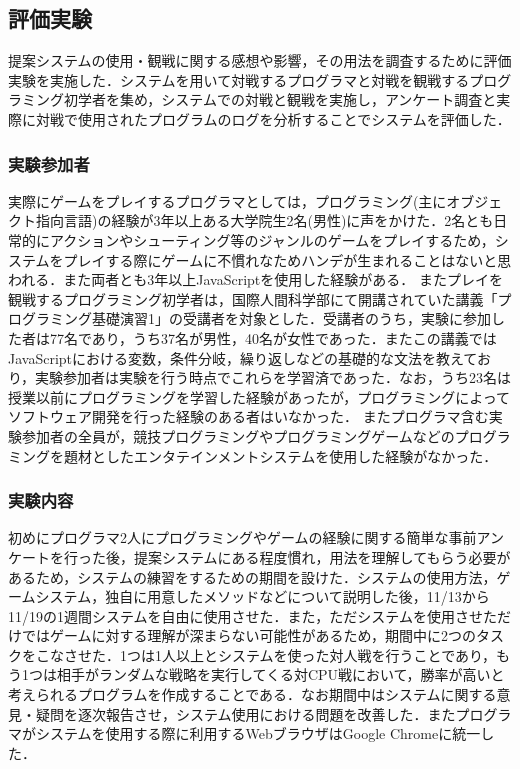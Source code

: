 \subsection{評価実験}
提案システムの使用・観戦に関する感想や影響，その用法を調査するために評価実験を実施した．システムを用いて対戦するプログラマと対戦を観戦するプログラミング初学者を集め，システムでの対戦と観戦を実施し，アンケート調査と実際に対戦で使用されたプログラムのログを分析することでシステムを評価した．

\subsubsection{実験参加者}
実際にゲームをプレイするプログラマとしては，プログラミング(主にオブジェクト指向言語)の経験が3年以上ある大学院生2名(男性)に声をかけた．2名とも日常的にアクションやシューティング等のジャンルのゲームをプレイするため，システムをプレイする際にゲームに不慣れなためハンデが生まれることはないと思われる．また両者とも3年以上JavaScriptを使用した経験がある．
またプレイを観戦するプログラミング初学者は，国際人間科学部にて開講されていた講義「プログラミング基礎演習1」の受講者を対象とした．受講者のうち，実験に参加した者は77名であり，うち37名が男性，40名が女性であった．またこの講義ではJavaScriptにおける変数，条件分岐，繰り返しなどの基礎的な文法を教えており，実験参加者は実験を行う時点でこれらを学習済であった．なお，うち23名は授業以前にプログラミングを学習した経験があったが，プログラミングによってソフトウェア開発を行った経験のある者はいなかった．
またプログラマ含む実験参加者の全員が，競技プログラミングやプログラミングゲームなどのプログラミングを題材としたエンタテインメントシステムを使用した経験がなかった．

\subsubsection{実験内容}

初めにプログラマ2人にプログラミングやゲームの経験に関する簡単な事前アンケートを行った後，提案システムにある程度慣れ，用法を理解してもらう必要があるため，システムの練習をするための期間を設けた．システムの使用方法，ゲームシステム，独自に用意したメソッドなどについて説明した後，11/13から11/19の1週間システムを自由に使用させた．また，ただシステムを使用させただけではゲームに対する理解が深まらない可能性があるため，期間中に2つのタスクをこなさせた．1つは1人以上とシステムを使った対人戦を行うことであり，もう1つは相手がランダムな戦略を実行してくる対CPU戦において，勝率が高いと考えられるプログラムを作成することである．なお期間中はシステムに関する意見・疑問を逐次報告させ，システム使用における問題を改善した．またプログラマがシステムを使用する際に利用するWebブラウザはGoogle Chromeに統一した．

